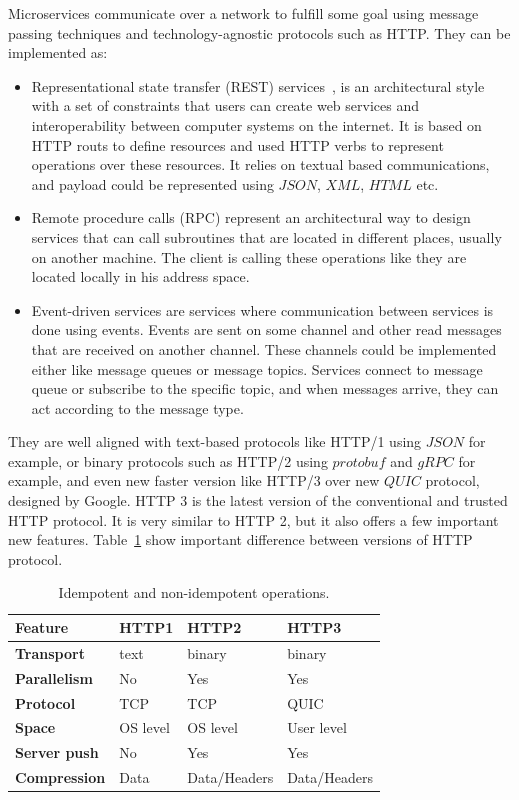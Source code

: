 Microservices communicate over a network to fulfill some goal using message passing techniques and technology-agnostic protocols such as HTTP. They can be implemented as:

\begin{itemize}
	\item Representational state transfer (REST) services~\cite{AdamczykSJH11}, is an architectural style with a set of constraints that users can create web services and interoperability between computer systems on the internet. It is based on HTTP routs to define resources and used HTTP verbs to represent operations over these resources. It relies on textual based communications, and payload could be represented using $JSON$, $XML$, $HTML$ etc.
	\item Remote procedure calls (RPC) represent an architectural way to design services that can call subroutines that are located in different places, usually on another machine. The client is calling these operations like they are located locally in his address space.
	\item Event-driven services are services where communication between services is done using events. Events are sent on some channel and other read messages that are received on another channel. These channels could be implemented either like message queues or message topics. Services connect to message queue or subscribe to the specific topic, and when messages arrive, they can act according to the message type.
\end{itemize}
 
\noindent
They are well aligned with text-based protocols like HTTP/1 using $JSON$ for example, or binary protocols such as HTTP/2 using $protobuf$ and $gRPC$ for example, and even new faster version like HTTP/3 over new $QUIC$ protocol, designed by Google. HTTP 3 is the latest version of the conventional and trusted HTTP protocol. It is very similar to HTTP 2, but it also offers a few important new features. Table~\ref{tab:table9} show important difference between versions of HTTP protocol.
 
 \begin{table}[h!]
 	\begin{center}
 		\begin{tabular}{l|l|l|l}
 			\textbf{Feature} & \textbf{HTTP1} & \textbf{HTTP2} & \textbf{HTTP3}\\
 			\hline
 			\textbf{Transport} & text & binary & binary\\
 			\textbf{Parallelism} & No & Yes & Yes\\
 			\textbf{Protocol} & TCP & TCP & QUIC \\
 			\textbf{Space} & OS level & OS level & User level\\
 			\textbf{Server push} & No & Yes & Yes\\
 			\textbf{Compression} & Data & Data/Headers & Data/Headers\\
 		\end{tabular}
 	\end{center}
 	\vspace{-0.5cm}
 	\caption{Idempotent and non-idempotent operations.}
 	\label{tab:table9}
 \end{table}
 
